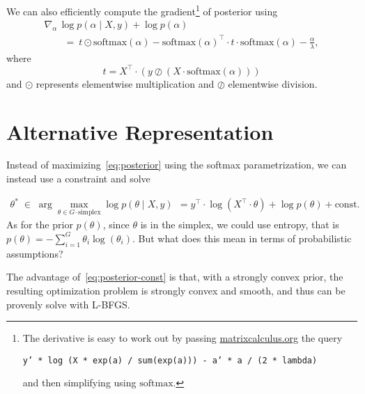 \documentclass[11pt]{article}
\begin{document}
We can also efficiently compute the gradient\footnote{The derivative is easy to work out
  by passing \url{matrixcalculus.org} the query
  \begin{center}\texttt{y' * log
(X * exp(a) / sum(exp(a))) - a' * a / (2 * lambda)}\end{center}
and then simplifying using $\textrm{softmax}$.} of posterior using 
\[
  \begin{array}{l}
  \nabla\!_{\alpha} \, \log p(\alpha \mid X, y) + \log p(\alpha)
  \\[4pt]
  \qquad = \
    t \odot \textrm{softmax}(\alpha)
    - \textrm{softmax}(\alpha)^{\top}\! \cdot t \cdot \textrm{softmax}(\alpha)
    - \frac{\displaystyle \alpha}{\displaystyle \lambda},
\end{array}
\]
where
\[
  t = X^{\top}\! \cdot (y \oslash (X \cdot \textrm{softmax}(\alpha)))
\]
and $\odot$ represents elementwise multiplication and $\oslash$
elementwise division. 


\section{Alternative Representation}

Instead of maximizing~\eqref{eq:posterior} using the softmax parametrization, we can instead use a constraint and solve

\begin{align}
\theta^* \; \in \; \arg \max_{\theta \in G\mbox{--simplex}}  \log p(\theta \mid X, y) &= y^{\top} \cdot \log \left( X^{\top} \cdot \theta \right)
         +\log p(\theta)+\textrm{const.} \label{eq:posterior-const}
\end{align} 
As for the prior $p(\theta)$, since $\theta$ is in the simplex, we could use entropy, that is $p(\theta) = -\sum_{i=1}^G \theta_i \log(\theta_i).$ But what does this mean in terms of probabilistic assumptions?

The advantage of~\eqref{eq:posterior-const} is that, with a strongly convex prior, the resulting optimization problem is strongly convex and smooth, and thus can be provenly solve with L-BFGS.
\end{document}
